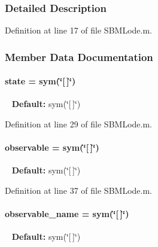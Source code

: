 \subsubsection{Detailed Description}


Definition at line 17 of file S\+B\+M\+Lode.\+m.



\subsubsection{Member Data Documentation}
\hypertarget{class_s_b_m_lode_adc6e5733fc3c22f0a7b2914188c49c90}{}
\paragraph[{state}]{\setlength{\rightskip}{0pt plus 5cm}state = sym(\char`\"{}\mbox{[}$\,$\mbox{]}\char`\"{})}\label{class_s_b_m_lode_adc6e5733fc3c22f0a7b2914188c49c90}
~\newline
{\bfseries Default\+:} sym(\char`\"{}\mbox{[}$\,$\mbox{]}\char`\"{}) 

Definition at line 29 of file S\+B\+M\+Lode.\+m.

\hypertarget{class_s_b_m_lode_a072b6f6192ac4f40e74b69f901ecdfef}{}
\paragraph[{observable}]{\setlength{\rightskip}{0pt plus 5cm}observable = sym(\char`\"{}\mbox{[}$\,$\mbox{]}\char`\"{})}\label{class_s_b_m_lode_a072b6f6192ac4f40e74b69f901ecdfef}
~\newline
{\bfseries Default\+:} sym(\char`\"{}\mbox{[}$\,$\mbox{]}\char`\"{}) 

Definition at line 37 of file S\+B\+M\+Lode.\+m.

\hypertarget{class_s_b_m_lode_a6e638e3379dc2d099b3cf3083246fbe0}{}
\paragraph[{observable\+\_\+name}]{\setlength{\rightskip}{0pt plus 5cm}observable\+\_\+name = sym(\char`\"{}\mbox{[}$\,$\mbox{]}\char`\"{})}\label{class_s_b_m_lode_a6e638e3379dc2d099b3cf3083246fbe0}
~\newline
{\bfseries Default\+:} sym(\char`\"{}\mbox{[}$\,$\mbox{]}\char`\"{}) 

